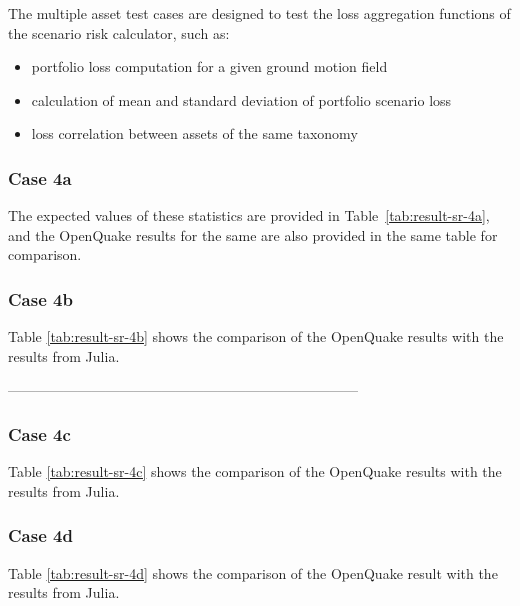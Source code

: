 The multiple asset test cases are designed to test the loss aggregation functions of the scenario risk calculator, such as:

\begin{itemize}
\item portfolio loss computation for a given ground motion field
\item calculation of mean and standard deviation of portfolio scenario loss
\item loss correlation between assets of the same taxonomy
\end{itemize}

\subsubsection{Case 4a}


 The expected values of these statistics are provided in Table~\ref{tab:result-sr-4a}, and the OpenQuake results for the same are also provided in the same table for comparison.

\subsubsection{Case 4b}


Table \ref{tab:result-sr-4b} shows the comparison of the OpenQuake results with the results from Julia.

---------------------------------------------------------------------------
\subsubsection{Case 4c}


Table \ref{tab:result-sr-4c} shows the comparison of the OpenQuake results with the results from Julia.

\subsubsection{Case 4d}


Table \ref{tab:result-sr-4d} shows the comparison of the OpenQuake result with the results from Julia.

